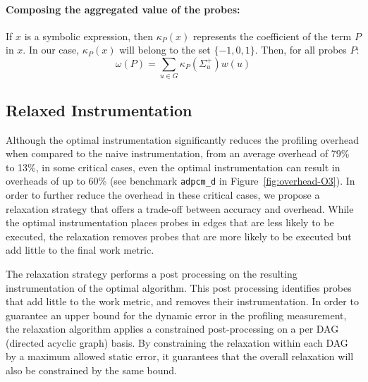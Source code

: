 \paragraph{Composing the aggregated value of the probes:}
If $x$ is a symbolic expression, then $\kappa_P(x)$ represents the coefficient
of the term $P$ in $x$.
In our case, $\kappa_P(x)$ will belong to the set $\{-1,0,1\}$.
Then, for all probes $P$:
\[
\omega(P) = \sum_{u\in G} \kappa_P(\Sigma^+_u)w(u)
\]

\subsection{Relaxed Instrumentation}

Although the optimal instrumentation significantly reduces the profiling
overhead when compared to the naive instrumentation, from an average overhead
of 79\% to 13\%, in some critical cases, even the optimal instrumentation can
result in overheads of up to 60\% (see benchmark \texttt{adpcm\_d} in Figure~\ref{fig:overhead-O3}).
In order to further reduce the overhead in these critical cases, we propose a
relaxation strategy that offers a trade-off between accuracy and overhead.
While the optimal instrumentation places probes in edges that are
less likely to be executed, the relaxation removes probes that are
more likely to be executed but add little to the final work metric.


The relaxation strategy performs a post processing on the resulting instrumentation of the optimal algorithm.
This post processing identifies probes that add little to the work metric, and removes their instrumentation.
In order to guarantee an upper bound for the dynamic error in the profiling measurement,
the relaxation algorithm applies a constrained post-processing on a per DAG (directed acyclic graph) basis.
By constraining the relaxation within each DAG by a maximum allowed static error,
it guarantees that the overall relaxation will also be constrained by the same bound.

